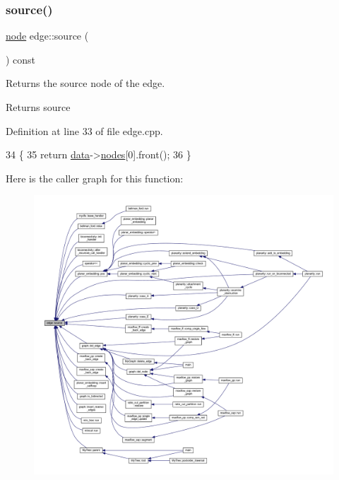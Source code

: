 \subsubsection{\texorpdfstring{source()}{source()}}
{\footnotesize\ttfamily \mbox{\hyperlink{classnode}{node}} edge\+::source (\begin{DoxyParamCaption}{ }\end{DoxyParamCaption}) const}

Returns the source node of the edge.

\begin{DoxyReturn}{Returns}
source 
\end{DoxyReturn}


Definition at line 33 of file edge.\+cpp.


\begin{DoxyCode}
34 \{
35     \textcolor{keywordflow}{return} \mbox{\hyperlink{classedge_a0ebb6dfa28b77f47529085049352b436}{data}}->\mbox{\hyperlink{classedge__data_a870bbbb05de6c5f63d434db624c55dd4}{nodes}}[0].front();
36 \}
\end{DoxyCode}
Here is the caller graph for this function\+:\nopagebreak
\begin{figure}[H]
\begin{center}
\leavevmode
\includegraphics[width=350pt]{classedge_ae82d5701f7e6f71edc3c8b0e34bcd2b7_icgraph}
\end{center}
\end{figure}
\mbox{\label{classedge_a6250fa136b02ad8f20e1dbc113a020a5}} 
